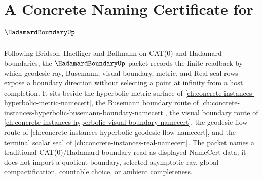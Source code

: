 \chapter{A Concrete Naming Certificate for $\HadamardBoundaryUp$}
\label{ch:concrete-instances-hadamard-boundary-namecert}

Following Bridson--Haefliger and Ballmann on CAT(0) and Hadamard boundaries, the $\HadamardBoundaryUp$ packet records the finite readback by which geodesic-ray, Busemann, visual-boundary, metric, and Real-seal rows expose a boundary direction without selecting a point at infinity from a host completion. It sits beside the hyperbolic metric surface of \autoref{ch:concrete-instances-hyperbolic-metric-namecert}, the Busemann boundary route of \autoref{ch:concrete-instances-hyperbolic-busemann-boundary-namecert}, the visual boundary route of \autoref{ch:concrete-instances-hyperbolic-visual-boundary-namecert}, the geodesic-flow route of \autoref{ch:concrete-instances-hyperbolic-geodesic-flow-namecert}, and the terminal scalar seal of \autoref{ch:concrete-instances-real-namecert}. The packet names a traditional CAT(0)/Hadamard boundary read as displayed NameCert data; it does not import a quotient boundary, selected asymptotic ray, global compactification, countable choice, or ambient completeness.

